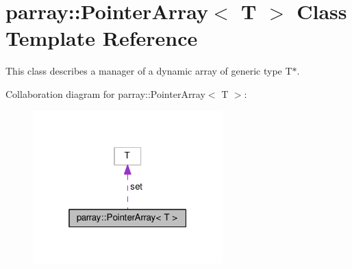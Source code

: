 \hypertarget{classparray_1_1PointerArray}{\section{parray\-:\-:Pointer\-Array$<$ T $>$ Class Template Reference}
\label{classparray_1_1PointerArray}
}


This class describes a manager of a dynamic array of generic type T$\ast$.  




Collaboration diagram for parray\-:\-:Pointer\-Array$<$ T $>$\-:\nopagebreak
\begin{figure}[H]
\begin{center}
\leavevmode
\includegraphics[width=208pt]{classparray_1_1PointerArray__coll__graph}
\end{center}
\end{figure}
